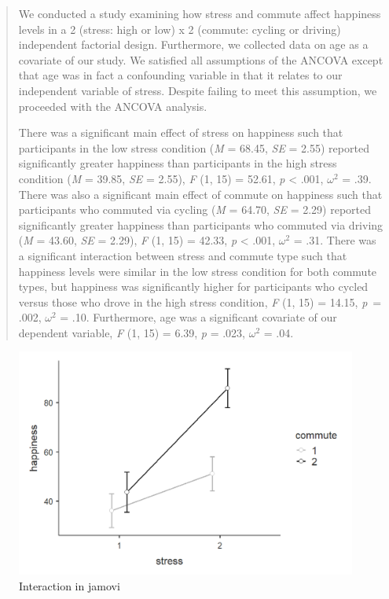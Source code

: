 \documentclass[
]{book}
\begin{document}
\begin{quote}
We conducted a study examining how stress and commute affect happiness levels in a 2 (stress: high or low) x 2 (commute: cycling or driving) independent factorial design. Furthermore, we collected data on age as a covariate of our study. We satisfied all assumptions of the ANCOVA except that age was in fact a confounding variable in that it relates to our independent variable of stress. Despite failing to meet this assumption, we proceeded with the ANCOVA analysis.

There was a significant main effect of stress on happiness such that participants in the low stress condition (\emph{M} = 68.45, \emph{SE} = 2.55) reported significantly greater happiness than participants in the high stress condition (\emph{M} = 39.85, \emph{SE} = 2.55), \emph{F} (1, 15) = 52.61, \emph{p} \textless{} .001, \(\omega^2\) = .39. There was also a significant main effect of commute on happiness such that participants who commuted via cycling (\emph{M} = 64.70, \emph{SE} = 2.29) reported significantly greater happiness than participants who commuted via driving (\emph{M} = 43.60, \emph{SE} = 2.29), \emph{F} (1, 15) = 42.33, \emph{p} \textless{} .001, \(\omega^2\) = .31. There was a significant interaction between stress and commute type such that happiness levels were similar in the low stress condition for both commute types, but happiness was significantly higher for participants who cycled versus those who drove in the high stress condition, \emph{F} (1, 15) = 14.15, \emph{p}~= .002, \(\omega^2\) = .10. Furthermore, age was a significant covariate of our dependent variable, \emph{F} (1, 15) = 6.39, \emph{p} = .023, \(\omega^2\) = .04.
\end{quote}

\begin{figure}

{\centering \includegraphics[width=1\linewidth]{images/07-ancova/ancova_interaction} 

}

\caption{Interaction in jamovi}\label{fig:unnamed-chunk-7}
\end{figure}
\end{document}
